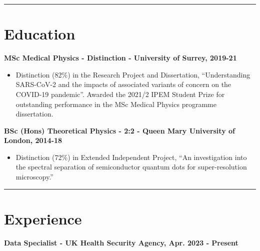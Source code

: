 \documentclass[10pt,a4paper]{article}
\def\Plus{\texttt{+}}
\begin{document}
\hrule

\section*{\faGraduationCap\space\bf Education}

\noindent \textbf{MSc Medical Physics - Distinction - University of Surrey, 2019-21}
\begin{itemize}[leftmargin=*,align=left]
\normalfont
\item Distinction (82$\%$) in the Research Project and Dissertation, ``Understanding SARS-CoV-2 and the impacts of associated variants of concern on the COVID-19 pandemic''. Awarded the 2021/2 IPEM Student Prize for outstanding performance in the MSc Medical Physics programme dissertation.
\end{itemize}

\noindent \textbf{BSc (Hons) Theoretical Physics - 2:2 - Queen Mary University of London, 2014-18}
\begin{itemize}[leftmargin=*,align=left]
\normalfont
\item Distinction (72$\%$) in Extended Independent Project, ``An investigation into the spectral separation of semiconductor quantum dots for super-resolution microscopy.''
\end{itemize}

\hrule

\section*{\faBriefcase\space\bf Experience}

\noindent \bf Data Specialist - UK Health Security Agency, Apr. 2023 - Present
\end{document}

